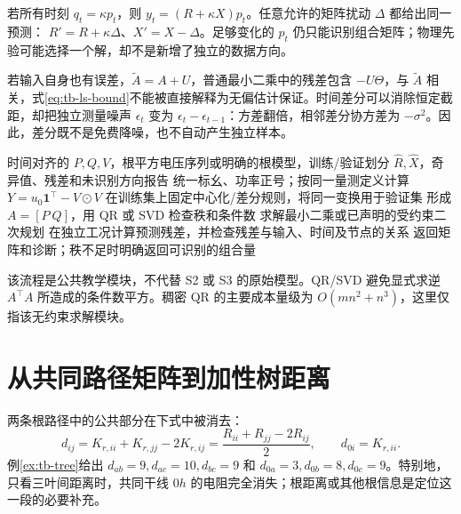 \begin{example}[功率因数固定时的不可分辨]
若所有时刻 $q_t=\kappa p_t$，则 $y_t=(R+\kappa X)p_t$。任意允许的矩阵扰动 $\Delta$ 都给出同一预测：
$R'=R+\kappa\Delta$、$X'=X-\Delta$。足够变化的 $p_t$ 仍只能识别组合矩阵；物理先验可能选择一个解，却不是新增了独立的数据方向。
\end{example}

若输入自身也有误差，$\widetilde A=A+U$，普通最小二乘中的残差包含 $-U\Theta$，与 $\widetilde A$ 相关，式\eqref{eq:tb-ls-bound}不能被直接解释为无偏估计保证。时间差分可以消除恒定截距，却把独立测量噪声 $\epsilon_t$ 变为 $\epsilon_t-\epsilon_{t-1}$：方差翻倍，相邻差分协方差为 $-\sigma^2$。因此，差分既不是免费降噪，也不自动产生独立样本。

\begin{algorithm}[htbp]
\caption{教学模块：从 P/Q/V 数据到可审查的灵敏度估计}
\begin{algorithmic}[1]
\Require 时间对齐的 $P,Q,V$，根平方电压序列或明确的根模型，训练/验证划分
\Ensure $\widehat R,\widehat X$，奇异值、残差和未识别方向报告
\State 统一标幺、功率正号；按同一量测定义计算 $Y=u_0\mathbf1^\top-V\odot V$
\State 在训练集上固定中心化/差分规则，将同一变换用于验证集
\State 形成 $A=[P\ Q]$，用 QR 或 SVD 检查秩和条件数
\State 求解最小二乘或已声明的受约束二次规划
\State 在独立工况计算预测残差，并检查残差与输入、时间及节点的关系
\State 返回矩阵和诊断；秩不足时明确返回可识别的组合量
\end{algorithmic}
\end{algorithm}
该流程是公共教学模块，不代替 S2 或 S3 的原始模型。QR/SVD 避免显式求逆 $A^\top A$ 所造成的条件数平方。稠密 QR 的主要成本量级为 $O(mn^2+n^3)$，这里仅指该无约束求解模块。

\section{从共同路径矩阵到加性树距离}
两条根路径中的公共部分在下式中被消去：
\begin{equation}
 d_{ij}=K_{r,ii}+K_{r,jj}-2K_{r,ij}
       =\frac{R_{ii}+R_{jj}-2R_{ij}}2,
 \qquad d_{0i}=K_{r,ii}.\label{eq:tb-distance}
\end{equation}
例\ref{ex:tb-tree}给出 $d_{ab}=9,d_{ac}=10,d_{bc}=9$ 和 $d_{0a}=3,d_{0b}=8,d_{0c}=9$。特别地，只看三叶间距离时，共同干线 $0h$ 的电阻完全消失；根距离或其他根信息是定位这一段的必要补充。

